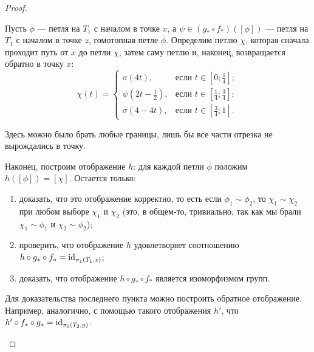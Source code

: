 \documentclass[main]{subfiles}
\begin{document}
\begin{proof}
\begin{phased}
			Пусть $ \phi $ --- петля на $ T_1 $ с началом в точке $ x $, а $ \psi \in (g_* \circ f_*)([\phi]) $ ---
			петля на $ T_1 $ с началом в точке $ z $, гомотопная петле $ \phi $. Определим петлю $ \chi $,
			которая сначала проходит путь от $ x $ до петли $ \chi $, затем саму петлю и, наконец,
			возвращается обратно в точку $ x $:
				\[ \chi(t) = \begin{cases}
						\sigma(4 t),
							& \text{если } t \in \left[ 0; \frac{1}{4} \right]; \\
						\psi\left(2 t - \frac{1}{2}\right),
							& \text{если } t \in \left[ \frac{1}{4}; \frac{3}{4} \right]; \\
						\sigma(4-4 t),
							& \text{если } t \in \left[ \frac{3}{4}; 1 \right].
					\end{cases}
				\]
			\begin{remark}
				Здесь можно было брать любые границы, лишь бы все части отрезка не вырождались в точку.
			\end{remark}
			Наконец, построим отображение $ h $: для каждой петли $ \phi $ положим
			$ h([\phi]) = [\chi] $. Остается только:
			\begin{enumerate}
				\item доказать, что это отображение корректно, то есть если $ \phi_1 \sim \phi_2 $,
					то $ \chi_1 \sim \chi_2 $ при любом выборе $ \chi_1 $ и $ \chi_2 $ (это, в общем-то, тривиально,
					так как мы брали $ \chi_1 \sim \phi_1 $ и $ \chi_2 \sim \phi_2 $);
				\item проверить, что отображение $ h $ удовлетворяет соотношению
					$ h \circ g_* \circ f_* = \operatorname{id}_{\pi_1(T_1, x)} $;
				\item доказать, что отображение $ h \circ g_* \circ f_* $ является изоморфизмом групп.
			\end{enumerate}
			Для доказательства последнего пункта можно  построить обратное отображение. Например, аналогично, с
			помощью такого отображения $ h' $, что $ h' \circ f_* \circ g_* = \operatorname{id}_{\pi_1(T_2, y)} $.
	\end{phased}
\end{proof}
\end{document}
